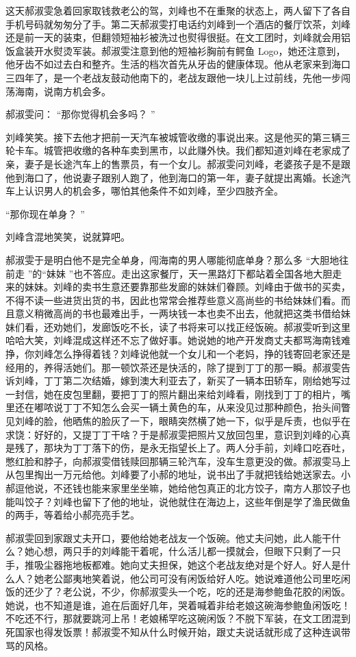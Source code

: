 \documentclass[12pt,twoside,openany]{book}
\begin{document}
这天郝淑雯急着回家取钱救老公的驾，刘峰也不在重聚的状态上，两人留下了各自手机号码就匆匆分了手。第二天郝淑雯打电话约刘峰到一个酒店的餐厅饮茶，刘峰还是前一天的装束，但翻领短袖衫被洗过也熨得很挺。在文工团时，刘峰就会用铝饭盒装开水熨烫军装。郝淑雯注意到他的短袖衫胸前有鳄鱼 Logo，她还注意到，他牙齿不如过去白和整齐。生活的档次首先从牙齿的健康体现。他从老家来到海口三四年了，是一个老战友鼓动他南下的，老战友跟他一块儿上过前线，先他一步闯荡海南，说南方机会多。

郝淑雯问： “那你觉得机会多吗？ ”

刘峰笑笑。接下去他才把前一天汽车被城管收缴的事说出来。这是他买的第三辆三轮卡车。城管把收缴的各种车卖到黑市，以此赚外快。我们都知道刘峰在老家成了亲，妻子是长途汽车上的售票员，有一个女儿。郝淑雯问刘峰，老婆孩子是不是跟他到海口了，他说妻子跟别人跑了，他到海口的第一年，妻子就提出离婚。长途汽车上认识男人的机会多，哪怕其他条件不如刘峰，至少四肢齐全。

“那你现在单身？ ”

刘峰含混地笑笑，说就算吧。

郝淑雯于是明白他不是完全单身，闯海南的男人哪能彻底单身？那么多 “大胆地往前走 ”的“妹妹 ”也不答应。走出这家餐厅，天一黑路灯下都站着全国各地大胆走来的妹妹。刘峰的卖书生意还要靠那些发廊的妹妹们眷顾。刘峰由于做书的买卖，不得不读一些进货出货的书，因此也常常会推荐些意义高尚些的书给妹妹们看。而且意义稍微高尚的书也最难出手，一两块钱一本也卖不出去，他就把这类书借给妹妹们看，还劝她们，发廊饭吃不长，读了书将来可以找正经饭碗。郝淑雯听到这里哈哈大笑，刘峰混成这样还不忘了做好事。她说她的地产开发商丈夫都骂海南钱难挣，你刘峰怎么挣得着钱？刘峰说他就一个女儿和一个老妈，挣的钱寄回老家还是经用的，养得活她们。那一顿饮茶还是快活的，除了提到丁丁的那一瞬。郝淑雯告诉刘峰，丁丁第二次结婚，嫁到澳大利亚去了，新买了一辆本田轿车，刚给她写过一封信，她在皮包里翻，要把丁丁的照片翻出来给刘峰看，刚找到丁丁的相片，嘴里还在嘟哝说丁丁不知怎么会买一辆土黄色的车，从来没见过那种颜色，抬头间瞥见刘峰的脸，他晒焦的脸灰了一下，眼睛突然横了她一下，似乎是斥责，也似乎在求饶：好好的，又提丁丁干啥？于是郝淑雯把照片又放回包里，意识到刘峰的心真是残了，那块为丁丁落下的伤，是永无指望长上了。两人分手前，刘峰口吃吞吐，憋红脸和脖子，向郝淑雯借钱赎回那辆三轮汽车，没车生意更没的做。郝淑雯马上从包里掏出一万元给他。刘峰要了小郝的地址，说书出了手就把钱给她送家去。小郝逗他说，不还钱也能来家里坐坐嘛，她给他包真正的北方饺子，南方人那饺子也能叫饺子？刘峰也留下了他的地址，说他就住在海边上，这些年倒是学了渔民做鱼的两手，等着给小郝亮亮手艺。

郝淑雯回到家跟丈夫开口，要他给她老战友一个饭碗。他丈夫问她，此人能干什么？她心想，两只手的刘峰能干着呢，什么活儿都一摸就会，但眼下只剩了一只手，推吸尘器拖地板都难。她向丈夫担保，她这个老战友绝对是个好人。好人是什么人？她老公鄙夷地笑着说，他公司可没有闲饭给好人吃。她说难道他公司里吃闲饭的还少了？老公说，不少，你郝淑雯头一个吃，吃的还是海参鲍鱼花胶的闲饭。她说，也不知道是谁，追在后面好几年，哭着喊着非给老娘这碗海参鲍鱼闲饭吃！不吃还不行，那就要跳河上吊！老娘稀罕吃这碗闲饭？不脱下军装，在文工团混到死国家也得发饭票！郝淑雯不知从什么时候开始，跟丈夫说话就形成了这种连讽带骂的风格。
\end{document}
